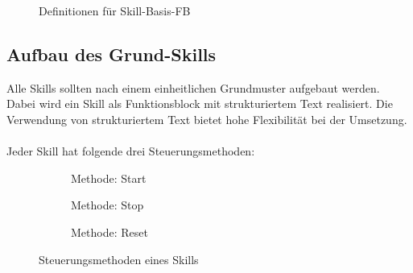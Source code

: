 		\begin{figure}[h!]
			\centering
			\captionsetup{justification=centering}
			\caption{Definitionen für Skill-Basis-FB}
			\label{fig:FB_Basis_Skill}
		\end{figure}
		
		\newpage
	
	\subsection{Aufbau des Grund-Skills} \label{Grundskill_Aufbau}
		Alle Skills sollten nach einem einheitlichen Grundmuster aufgebaut werden. Dabei wird ein Skill als Funktionsblock mit strukturiertem Text realisiert. Die Verwendung von strukturiertem Text bietet hohe Flexibilität bei der Umsetzung.
		\\
		\\
		Jeder Skill hat folgende drei Steuerungsmethoden: 
		\begin{figure}[h!]
			\centering
			\begin{subfigure}[b]{0.5\textwidth}
				\centering
				\caption{Methode: Start}
				\label{fig:Skill_MStart}
			\end{subfigure}
			\hfill
			\begin{subfigure}[b]{0.2\textwidth}
				\centering
				\caption{Methode: Stop}
				\label{fig:Skill_MStop}
			\end{subfigure}
			\hfill
			\begin{subfigure}[b]{0.2\textwidth}
				\centering
				\caption{Methode: Reset}
				\label{fig:Skill_MReset}
			\end{subfigure}
			\caption{Steuerungsmethoden eines Skills}
			\label{fig:Steuerungsmethoden}
		\end{figure}
		
